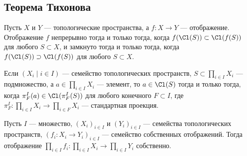 \documentclass[
	extrafontsizes,
	11pt,
	hyphens,
]{memoir}
\begin{document}
\subsection{Теорема Тихонова}

\begin{observation}
Пусть \(X\) и \(Y\) --- топологические пространства, а \(f : X \to Y\) --- отображение.
\label{obs:im-closed}
Отображение \(f\) непрерывно тогда и только тогда, когда \(f(\Cl(S)) \subset \Cl(f(S))\) для любого \(S \subset X\),
и замкнуто тогда и только тогда, когда \(f(\Cl(S)) \supset \Cl(f(S))\) для любого \(S \subset X\).
\end{observation}

\begin{observation}
\label{obs:top_prod_clos}
Если \((X_i \mid i \in I)\) --- семейство топологических пространств, \(S \subset \prod_{i \in I} X_i\) --- подмножество, а \(a \in \prod_{i \in I} X_i\) --- элемент,
то \(a \in \Cl(S)\) тогда и только тогда, когда
\(\pi^I_F(a) \in \Cl(\pi^I_F(S))\)
для любого конечного \(F \subset I\),
где \(\pi^I_F : \prod_{i \in I} X_i \to \prod_{i \in F} X_i\) --- стандартная проекция.
\end{observation}

\begin{theorem}
Пусть \(I\) --- множество,
\((X_i)_{i \in I}\) и \((Y_i)_{i \in I}\) --- семейства топологических пространств,
\((f_i : X_i \to Y_i)_{i \in I}\) --- семейство собственных отображений.
Тогда отображение
\(\prod_{i \in I} f_i : \prod_{i \in I} X_i \to \prod_{i \in I} Y_i\) собственно. 
\end{theorem}
\end{document}
